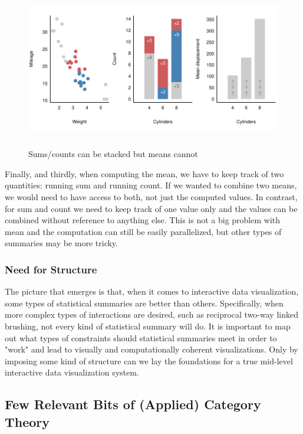 \documentclass[12pt,a4paper]{article}
\begin{document}
\begin{figure}[H]
\centering
\includegraphics[height=70mm]{./figure02.pdf}
\caption{Sums/counts can be stacked but means cannot}
\label{fig:empty}
\end{figure}

Finally, and thirdly, when computing the mean, we have to keep track of two quantities: running sum and running count. If we wanted to combine two means, we would need to have access to both, not just the computed values. In contrast, for sum and count we need to keep track of one value only and the values can be combined without reference to anything else. This is not a big problem with mean and the computation can still be easily parallelized, but other types of summaries may be more tricky.

\subsubsection{Need for Structure}

The picture that emerges is that, when it comes to interactive data visualization, some types of statistical summaries are better than others. Specifically, when more complex types of interactions are desired, such as reciprocal two-way linked brushing, not every kind of statistical summary will do. It is important to map out what types of constraints should statistical summaries meet in order to "work" and lead to visually and computationally coherent visualizations. Only by imposing some kind of structure can we lay the foundations for a true mid-level interactive data visualization system. 


\subsection{Few Relevant Bits of (Applied) Category Theory}
\end{document}
